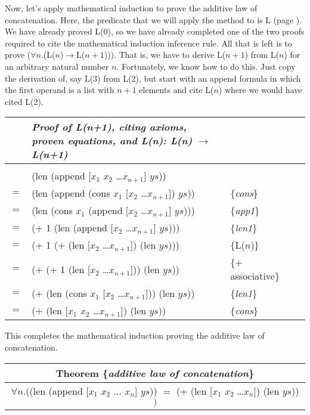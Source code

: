\label{induction-hyp-def}Now,
let's apply mathematical induction to prove
the additive law of concatenation.
Here, the predicate that we will apply the method to is L
(page \pageref{additive-concat-law-predicate}).
\label{len-additive-thm}We
have already proved L(0), so we have already completed one of the
two proofs required to cite the mathematical induction inference rule.
All that is left is to prove ($\forall$$n$.(L($n$)$\rightarrow$L($n+1$))).
That is, we have to derive L($n+1$) from L($n$) for an arbitrary natural number $n$.
Fortunately, we know how to do this. Just copy the derivation of,
say L(3) from L(2), but start with an append formula in which the first operand
is a list with $n+1$ elements and cite L($n$) where we would have cited L(2).
\begin{center}
\begin{tabular}{llll}
&\emph{Proof of L(n+1), citing axioms, proven equations, and L(n): L(n) $\rightarrow$ L(n+1)}&&\\
\hline\\[-1.0em]
    & \textsf{(len (append [$x_1$ $x_2$ \dots $x_{n+1}$] $ys$))}         &                     &~\\
$=$ & \textsf{(len (append (cons $x_1$ [$x_2$ \dots $x_{n+1}$]) $ys$))}  & \{\emph{cons}\}     &~\\
$=$ & \textsf{(len (cons $x_1$ (append [$x_2$ \dots $x_{n+1}$] $ys$)))}  & \{\emph{app1}\}     &~\\
$=$ & \textsf{(+ 1 (len (append [$x_2$ \dots $x_{n+1}$] $ys$)))}         & \{\emph{len1}\}     &~\\
$=$ & \textsf{(+ 1 (+ (len [$x_2$ \dots $x_{n+1}$]) (len $ys$)))}        & \{L($n$)\}          &~\\
$=$ & \textsf{(+ (+ 1 (len [$x_2$ \dots $x_{n+1}$])) (len $ys$))}        & \{$+$ associative\} &~\\
$=$ & \textsf{(+ (len (cons $x_1$ [$x_2$ \dots $x_{n+1}$])) (len $ys$))} & \{\emph{len1}\}     &~\\
$=$ & \textsf{(+ (len [$x_1$ $x_2$ \dots $x_{n+1}$]) (len $ys$))}        & \{\emph{cons}\}     &~\\
\end{tabular}
\end{center}
This completes the mathematical induction proving the
additive law of concatenation.

\begin{center}
\label{additive-law-concatenation}
\begin{tabular}{c}
Theorem \{\emph{additive law of concatenation}\} \\
\hline
$\forall n.($\textsf{(len (append [$x_1$ $x_2$ $\dots$ $x_n$] $ys$))}
$=$ \textsf{(+ (len [$x_1$ $x_2$ \dots $x_n$]) (len $ys$))}$)$\\
\end{tabular}
\end{center}

